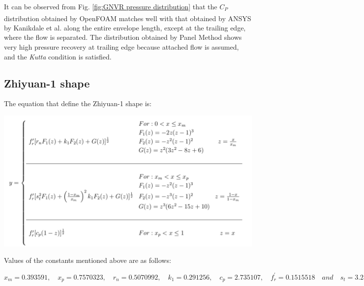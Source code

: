 It can be observed from Fig. \ref{fig:GNVR pressure distribution} that the $C_{P}$ distribution obtained by OpenFOAM\textsuperscript{\textregistered} matches well with that obtained by ANSYS\textsuperscript{\textregistered} by Kanikdale et al. \cite{kanikdale2004multi} along the entire envelope length, except at the trailing edge, where the flow is separated. The distribution obtained by Panel Method \cite{gnvr2000} shows very high pressure recovery at trailing edge because attached flow is assumed, and the \textit{Kutta} condition is satisfied.

\subsection{Zhiyuan-1 shape \cite{Wang2010}}

The equation that define the Zhiyuan-1 shape is:
\begin{center}
	\includegraphics[width= 400 pt]{rnd/zhiyuan_equations.png}
\end{center}
Values of the constants mentioned above are as follows:

$ x_{m} = 0.393591, \quad x_{p} = 0.7570323,\quad r_{n} = 0.5070992,\quad k_{1} = 0.291256,\quad c_{p} = 2.735107,\quad f_{r}^{'} = 0.1515518 \quad and \quad  s_{t} = 3.236105 $


